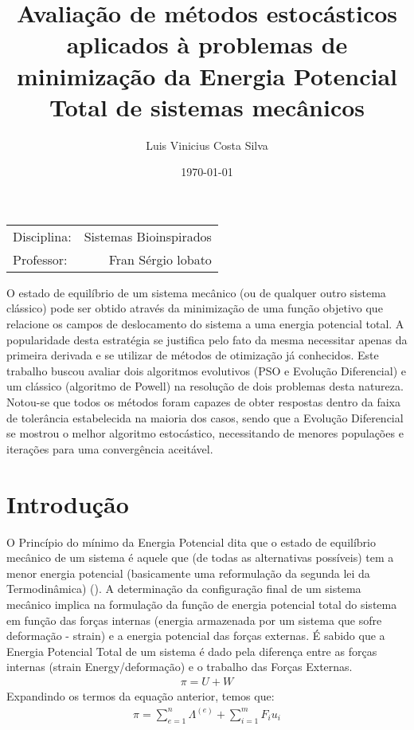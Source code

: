 \documentclass{article}
\title{Avaliação de métodos estocásticos aplicados à problemas de minimização da Energia Potencial Total de sistemas mecânicos}
\author{Luis Vinicius Costa Silva}
\date{\today}
\begin{document}
\maketitle
\nocite{*} 
\begin{center}
\begin{tabular}{l r}
Disciplina: & Sistemas Bioinspirados \\
Professor: & Fran Sérgio lobato
\end{tabular}
\end{center}
\abstract
O estado de equilíbrio de um sistema mecânico (ou de qualquer outro sistema clássico) pode ser obtido através da minimização de uma função objetivo que relacione os campos de deslocamento do sistema a uma energia potencial total. A popularidade desta estratégia se justifica pelo fato da mesma necessitar apenas da primeira derivada e se utilizar de métodos de otimização já conhecidos. Este trabalho buscou avaliar dois algoritmos evolutivos (PSO e Evolução Diferencial) e um clássico (algoritmo de Powell) na resolução de dois problemas desta natureza. Notou-se que todos os métodos foram capazes de obter respostas dentro da faixa de tolerância estabelecida na maioria dos casos, sendo que a Evolução Diferencial se mostrou o melhor algoritmo estocástico, necessitando de menores populações e iterações para uma convergência aceitável.
\section{Introdução}
O Princípio do mínimo da Energia Potencial dita que o estado de equilíbrio mecânico de um sistema é aquele que (de todas as alternativas possíveis) tem a menor energia potencial (basicamente uma reformulação da segunda lei da Termodinâmica) (\cite{reddy2007introduction}). A determinação da configuração final de um sistema mecânico implica na formulação da função de energia potencial total do sistema em função das forças internas (energia armazenada por um sistema que sofre deformação - strain) e a energia potencial das forças externas. 
É sabido que a Energia Potencial Total de um sistema é dado pela diferença entre as forças internas (strain Energy/deformação) e o trabalho das Forças Externas.
\begin{equation}
\begin{split}
\pi = U + W
\end{split}
\end{equation}
Expandindo os termos da equação anterior, temos que:
\begin{equation}
\begin{split}
\pi = \sum_{e=1}^{n} \Lambda^{(e)} + \sum_{i=1}^{m} F_i u_i
\end{split}
\end{equation}
\end{document}
